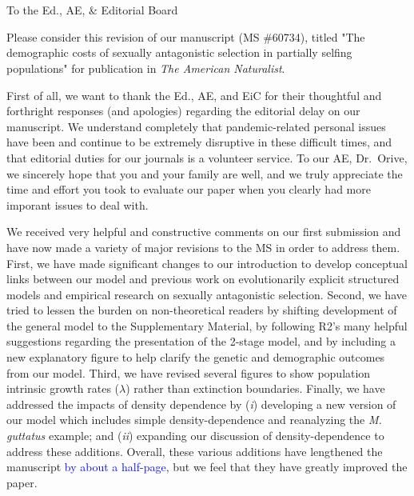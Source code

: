 \documentclass[11pt]{article}
\begin{document}




\section*{}
\noindent To the Ed., AE, \& Editorial Board
\bigskip

\noindent Please consider this revision of our manuscript (MS \#60734), titled "The demographic costs of sexually antagonistic selection in partially selfing populations" for publication in \textit{The American Naturalist}. 
\bigskip

\noindent First of all, we want to thank the Ed., AE, and EiC for their thoughtful and forthright responses (and apologies) regarding the editorial delay on our manuscript. We understand completely that pandemic-related personal issues have been and continue to be extremely disruptive in these difficult times, and that editorial duties for our journals is a volunteer service. To our AE, Dr.~Orive, we sincerely hope that you and your family are well, and we truly appreciate the time and effort you took to evaluate our paper when you clearly had more imporant issues to deal with.
\bigskip

\noindent We received very helpful and constructive comments on our first submission and have now made a variety of major revisions to the MS in order to address them. First, we have made significant changes to our introduction to develop conceptual links between our model and previous work on evolutionarily explicit structured models and empirical research on sexually antagonistic selection. Second, we have tried to lessen the burden on non-theoretical readers by shifting development of the general model to the Supplementary Material, by following R2's many helpful suggestions regarding the presentation of the 2-stage model, and by including a new explanatory figure to help clarify the genetic and demographic outcomes from our model. Third, we have revised several figures to show population intrinsic growth rates ($\lambda$) rather than extinction boundaries. Finally, we have addressed the impacts of density dependence by ({\itshape i}) developing a new version of our model which includes simple density-dependence and reanalyzing the {\itshape M. guttatus} example; and ({\itshape ii}) expanding our discussion of density-dependence to address these additions. Overall, these various additions have lengthened the manuscript \textcolor{blue}{by about a half-page}, but we feel that they have greatly improved the paper. 
\bigskip
\end{document}

